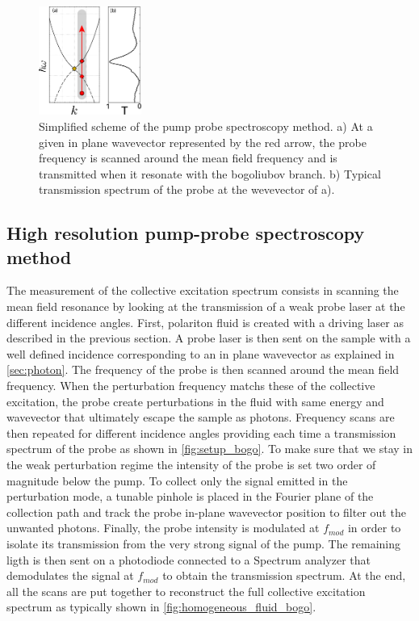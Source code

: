 \begin{figure}[h]
    \centering
    \includegraphics[width=0.3\textwidth]{chap3_custom_st/fig/setup_bogoliubov.pdf}
    \caption{Simplified scheme of the pump probe spectroscopy method. a) At a given in plane wavevector represented by the red arrow, the probe frequency is scanned around the mean field frequency and is transmitted when it resonate with the bogoliubov branch. b) Typical transmission spectrum of the probe at the wevevector of a).}
    \label{fig:setup_bogo}
\end{figure}


\subsection{High resolution pump-probe spectroscopy method}

\label{sub:high_resolution_spectroscopy}

The measurement of the collective excitation spectrum consists in scanning the mean field resonance by looking at the transmission of a weak probe laser at the different incidence angles. First, polariton fluid is created with a driving laser as described in the previous section. A probe laser is then sent on the sample with a well defined incidence corresponding to an in plane wavevector as explained in \autoref{sec:photon}. The frequency of 
the probe is then scanned around the mean field frequency. When the perturbation frequency matchs these of the collective excitation, the probe create perturbations in the fluid with same energy and wavevector that ultimately escape the sample as photons. Frequency scans are then repeated for different incidence angles providing each time a transmission spectrum of the probe as shown in \autoref{fig:setup_bogo}. 
To make sure that we stay in the weak perturbation regime the intensity of the probe is set two order of magnitude below the pump. To collect only the signal emitted in the perturbation mode, a tunable pinhole is placed in the Fourier plane of the collection path and track the probe in-plane wavevector position to filter out the unwanted photons. Finally, the probe intensity is modulated at $f_{mod}$ in order to isolate its transmission from the very strong signal of the pump. The remaining ligth is then sent on
a photodiode connected to a Spectrum analyzer that demodulates the signal at $f_{mod}$ to obtain the transmission spectrum. At the end, all the scans are put together to reconstruct the full collective excitation spectrum as typically shown in \autoref{fig:homogeneous_fluid_bogo}.



